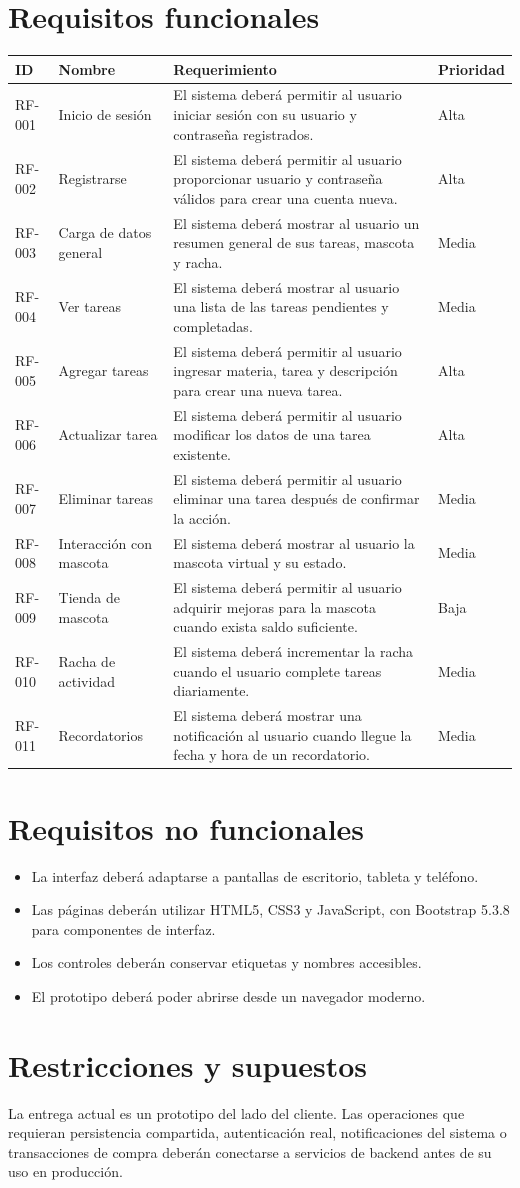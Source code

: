 \documentclass[12pt]{article}
\begin{document}
\section{Requisitos funcionales}
\begin{longtable}{|p{1.4cm}|p{3.1cm}|p{8.3cm}|p{1.5cm}|}
\hline
\textbf{ID} & \textbf{Nombre} & \textbf{Requerimiento} & \textbf{Prioridad} \\
\hline
RF-001 & Inicio de sesión & El sistema deberá permitir al usuario iniciar sesión con su usuario y contraseña registrados. & Alta \\
\hline
RF-002 & Registrarse & El sistema deberá permitir al usuario proporcionar usuario y contraseña válidos para crear una cuenta nueva. & Alta \\
\hline
RF-003 & Carga de datos general & El sistema deberá mostrar al usuario un resumen general de sus tareas, mascota y racha. & Media \\
\hline
RF-004 & Ver tareas & El sistema deberá mostrar al usuario una lista de las tareas pendientes y completadas. & Media \\
\hline
RF-005 & Agregar tareas & El sistema deberá permitir al usuario ingresar materia, tarea y descripción para crear una nueva tarea. & Alta \\
\hline
RF-006 & Actualizar tarea & El sistema deberá permitir al usuario modificar los datos de una tarea existente. & Alta \\
\hline
RF-007 & Eliminar tareas & El sistema deberá permitir al usuario eliminar una tarea después de confirmar la acción. & Media \\
\hline
RF-008 & Interacción con mascota & El sistema deberá mostrar al usuario la mascota virtual y su estado. & Media \\
\hline
RF-009 & Tienda de mascota & El sistema deberá permitir al usuario adquirir mejoras para la mascota cuando exista saldo suficiente. & Baja \\
\hline
RF-010 & Racha de actividad & El sistema deberá incrementar la racha cuando el usuario complete tareas diariamente. & Media \\
\hline
RF-011 & Recordatorios & El sistema deberá mostrar una notificación al usuario cuando llegue la fecha y hora de un recordatorio. & Media \\
\hline
\end{longtable}
\section{Requisitos no funcionales}
\begin{itemize}
    \item La interfaz deberá adaptarse a pantallas de escritorio, tableta y teléfono.
    \item Las páginas deberán utilizar HTML5, CSS3 y JavaScript, con Bootstrap 5.3.8 para componentes de interfaz.
    \item Los controles deberán conservar etiquetas y nombres accesibles.
    \item El prototipo deberá poder abrirse desde un navegador moderno.
\end{itemize}
\section{Restricciones y supuestos}
La entrega actual es un prototipo del lado del cliente. Las operaciones que requieran persistencia compartida, autenticación real, notificaciones del sistema o transacciones de compra deberán conectarse a servicios de backend antes de su uso en producción.
\end{document}
